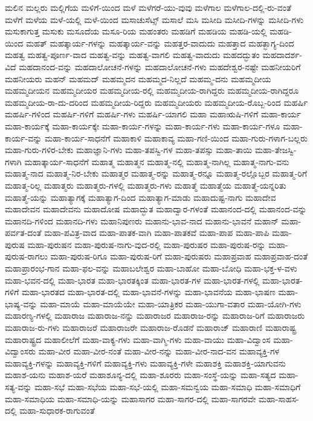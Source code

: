 {ಮಲಿನ
ಮಲ್ಲರು
ಮಲ್ಲಿಗೆಯ
ಮಳಿಗೆ-ಯಿಂದ
ಮಳೆ
ಮಳೆಗರೆ-ಯು-ವುವು
ಮಳೆಗಾಲ
ಮಳೆಗಾಲ-ದಲ್ಲಿ-ರು-ವಂತೆ
ಮಳೆಗೆ
ಮಳೆಯ
ಮಳೆ-ಯಲ್ಲಿ
ಮಳೆ-ಯಿಂದ
ಮಸಾಚುಸೆಟ್ಸ್
ಮಸಾಲೆ
ಮಸಿ
ಮಸೀದಿ
ಮಸೀದಿ-ಗಳನ್ನು
ಮಸೀದಿ-ಗಳು
ಮಸುಕಾಗುತ್ತ
ಮಸುಕು
ಮಸೂದೆಯ
ಮಸೂ-ರಿಯ
ಮಹಂತರು
ಮಹಡಿಗೆ
ಮಹಡಿಯ
ಮಹಡಿ-ಯಲ್ಲಿ
ಮಹಡಿ-ಯಿಂದ
ಮಹತ್
ಮಹತ್ಕಾರ್ಯ-ಗಳನ್ನು
ಮಹತ್ಕಾರ್ಯ-ವನ್ನು
ಮಹತ್ತರ-ವಾದುದು
ಮಹತ್ತಾದ
ಮಹತ್ಭಾಗ್ಯ-ದಿಂದ
ಮಹತ್ವ
ಮಹತ್ವ-ಪೂರ್ಣ-ವಾದ
ಮಹತ್ವ-ವನ್ನು
ಮಹತ್ವ-ವಾಗಲಿ
ಮಹತ್ವ-ವಾದುದು
ಮಹದದ್ಭುತಂ
ಮಹದಾದರ್ಶ-ವಿದೆ
ಮಹದಾನಂದ-ವನ್ನು
ಮಹದಾಲೋಚನೆ-ಗಳನ್ನು
ಮಹದಾಲೋಚನೆ-ಗಳು
ಮಹದೇಶ್ವರ-ನಷ್ಟೇ
ಮಹನೀಯರಿಗೆ
ಮಹನೀಯರು
ಮಹನ್
ಮಹಮದ್
ಮಹಮ್ಮದನ
ಮಹಮ್ಮದ-ನಿಲ್ಲದೆ
ಮಹಮ್ಮ-ದನು
ಮಹಮ್ಮದೀಯ
ಮಹಮ್ಮದೀಯನ
ಮಹಮ್ಮದೀಯರ
ಮಹಮ್ಮದೀಯ-ರಲ್ಲಿ
ಮಹಮ್ಮದೀಯ-ರಾಗಿದ್ದರು
ಮಹಮ್ಮದೀಯ-ರಾಗಿದ್ದರೂ
ಮಹಮ್ಮದೀಯ-ರಾ-ದು-ದರಿಂದ
ಮಹಮ್ಮದೀಯ-ರಿದ್ದರು
ಮಹಮ್ಮದೀಯರು
ಮಹಮ್ಮದೀಯ-ರೊಬ್ಬ-ರಿಂದ
ಮಹರ್ಷಿ
ಮಹರ್ಷಿ-ಗಳಿಂದ
ಮಹರ್ಷಿ-ಗಳಿಗೆ
ಮಹರ್ಷಿ-ಗಳು
ಮಹರ್ಷಿ-ಯಾಗಲಿ
ಮಹಾ
ಮಹಾಋಷಿ-ಗಳಿಗೆ
ಮಹಾ-ಕಾರ್ಯ
ಮಹಾ-ಕಾರ್ಯಕ್ಕೆ
ಮಹಾ-ಕಾರ್ಯಕ್ಕೇ
ಮಹಾ-ಕಾರ್ಯ-ಗಳನ್ನು
ಮಹಾ-ಕಾರ್ಯ-ಗಳು
ಮಹಾ-ಕಾರ್ಯ-ಗಳೂ
ಮಹಾ-ಕಾರ್ಯ-ವನ್ನು
ಮಹಾ-ಕಾರ್ಯ-ಸಾಧನೆಗೆ
ಮಹಾಕಾಳಿ
ಮಹಾಕಾವ್ಯ
ಮಹಾ-ಗಣಿ-ಯಿಂದ
ಮಹಾ-ಗುರು-ಗಳಾಗ-ಬಲ್ಲರು
ಮಹಾ-ಗುರು-ಗಳಿರ-ಬೇಕು
ಮಹಾಜ್ಞಾನಿ-ಗಳು
ಮಹಾ-ತಪಸ್ವಿ-ಗಳ
ಮಹಾ-ತಪಸ್ಸು
ಮಹಾ-ತಾಯಿ
ಮಹಾ-ತೇಜಸ್ವಿ-ಗಳಾಗಿ
ಮಹಾತ್ಕಾರ್ಯ-ಸಾಧನೆಗೆ
ಮಹಾತ್ಮ
ಮಹಾತ್ಮನ
ಮಹಾತ್ಮ-ನಲ್ಲಿ
ಮಹಾತ್ಮ-ನಾಗಿಲ್ಲ
ಮಹಾತ್ಮ-ನಾಗು-ವನು
ಮಹಾತ್ಮ-ನಾದ
ಮಹಾತ್ಮ-ನಿರ-ಬೇಕು
ಮಹಾತ್ಮರ
ಮಹಾತ್ಮ-ರನ್ನು
ಮಹಾತ್ಮ-ರನ್ನೂ
ಮಹಾತ್ಮ-ರಲ್ಲೊಬ್ಬರ
ಮಹಾತ್ಮ-ರಿಗೆ
ಮಹಾತ್ಮ-ರಿಲ್ಲ
ಮಹಾತ್ಮರು
ಮಹಾತ್ಮರು-ಗಳಲ್ಲಿ
ಮಹಾತ್ಮರು-ಗಳು
ಮಹಾತ್ಮೆ
ಮಹಾತ್ಮೆಯ
ಮಹಾತ್ಮೆ-ಯನ್ನರಿತು
ಮಹಾತ್ಮೆ-ಯನ್ನು
ಮಹಾತ್ಯಾಗಕ್ಕೆ
ಮಹಾತ್ಯಾಗ-ದಿಂದ
ಮಹಾತ್ಯಾಗ-ಮಾಡು
ಮಹಾದುಷ್ಟ-ನಾಗು
ಮಹಾದೇವ
ಮಹಾದೇವನ
ಮಹಾದೇವನು
ಮಹಾದೋಷ
ಮಹಾದ್ಭುತ
ಮಹಾದ್ವಾರ-ಗಳಂತೆ
ಮಹಾನಂದ-ದಲ್ಲಿ
ಮಹಾನಂದ-ವನ್ನು
ಮಹಾನದಿ-ಗಳಿಂದ
ಮಹಾನದಿ-ಗಳು
ಮಹಾನಿಪುಣರು
ಮಹಾನು-ಭಾವ-ನಾದ
ಮಹಾನು-ಭಾವನೆ
ಮಹಾನ್
ಮಹಾ-ಪರ್ವತ-ದಂತೆ
ಮಹಾ-ಪವಿತ್ರ-ವಾದ
ಮಹಾ-ಪಾತಕ-ವಾಗಿ
ಮಹಾ-ಪಾತಕವೆ
ಮಹಾ-ಪಾಪ
ಮಹಾ-ಪಾಪಿ
ಮಹಾ-ಪುರುಷ
ಮಹಾ-ಪುರುಷನ
ಮಹಾ-ಪುರುಷ-ನಾಗು-ವುದ-ರಲ್ಲಿ
ಮಹಾ-ಪುರುಷರ
ಮಹಾ-ಪುರುಷ-ರನ್ನು
ಮಹಾ-ಪುರುಷ-ರಾಗಲು
ಮಹಾ-ಪುರುಷ-ರಿಗೂ
ಮಹಾ-ಪುರುಷ-ರಿಗೆ
ಮಹಾ-ಪುರುಷರು
ಮಹಾಪ್ರವಾಹ
ಮಹಾಪ್ರವಾಹ-ದಂತೆ
ಮಹಾಪ್ರಾರಂಭ-ಗಾನ
ಮಹಾ-ಫಲ-ವನ್ನು
ಮಹಾಬಲೇಶ್ವರ
ಮಹಾ-ಬಾಹೋ
ಮಹಾ-ಬೋಧಿ
ಮಹಾ-ಭಕ್ತ-ಳ-ವಳು
ಮಹಾ-ಭವನ-ದಲ್ಲಿ
ಮಹಾ-ಭಾರತ
ಮಹಾ-ಭಾರತಕ್ಕಿಂತ
ಮಹಾ-ಭಾರತ-ಗಳ
ಮಹಾ-ಭಾರತ-ಗಳಲ್ಲಿ
ಮಹಾ-ಭಾರತ-ಗಳಿಗೆ
ಮಹಾ-ಭಾರತದ
ಮಹಾ-ಭಾರತ-ದಲ್ಲಿ
ಮಹಾ-ಭಾವನೆ-ಗಳನ್ನು
ಮಹಾ-ಭಾವನೆಯ
ಮಹಾ-ಭಾಷಣ
ಮಹಾ-ಭಾಷ್ಯ-ವನ್ನು
ಮಹಾ-ಮಾಯೆ
ಮಹಾ-ಮಾಯೆಯೇ
ಮಹಾ-ಯಾತ್ರಿಕರ
ಮಹಾ-ಯುಗಾ-ವತಾರ
ಮಹಾ-ಯೋಗಿ-ಗಳು
ಮಹಾರಣ್ಯ-ಗಳಲ್ಲಿ
ಮಹಾರಾಜ
ಮಹಾರಾಜ-ನನ್ನು
ಮಹಾರಾಜರ
ಮಹಾರಾಜ-ರನ್ನು
ಮಹಾರಾಜ-ರಿಗೆ
ಮಹಾರಾಜರು
ಮಹಾರಾಜ-ರು-ಗಳು
ಮಹಾರಾಜರೆ
ಮಹಾರಾಜರೇ
ಮಹಾರಾಜ-ರೊಡನೆ
ಮಹಾರಾಜ್
ಮಹಾರಾಣಿ
ಮಹಾರಾಷ್ಟ್ರ
ಮಹಾರಾಷ್ಟ್ರದ
ಮಹಾಲೀಲೆಗೆ
ಮಹಾ-ವಾಕ್ಯ-ಗಳು
ಮಹಾ-ವಾಗ್ಮಿ-ಗಳು
ಮಹಾ-ವಾಯು
ಮಹಾ-ವಿದ್ವಾಂಸ
ಮಹಾ-ವಿದ್ವಾಂಸರು
ಮಹಾ-ವೀರ
ಮಹಾ-ವೀರ-ನಂತೆ
ಮಹಾ-ವೀರ-ನನ್ನು
ಮಹಾ-ವೀರ-ನಾದ-ವನ
ಮಹಾವ್ಯಕ್ತಿ-ಗಳ
ಮಹಾವ್ಯಕ್ತಿ-ಗಳನ್ನು
ಮಹಾವ್ಯಕ್ತಿ-ಗಳಿಗೆ
ಮಹಾವ್ಯಕ್ತಿ-ಗಳು
ಮಹಾವ್ಯಕ್ತಿ-ಗಳೇ
ಮಹಾಶಕ್ತಿ
ಮಹಾಶಕ್ತಿ-ಯಾಗುವನು
ಮಹಾಶ-ಯನು
ಮಹಾಶ-ಯರೆ
ಮಹಾಶೂನ್ಯ-ದಲ್ಲಿ
ಮಹಾ-ಶೂರರು
ಮಹಾ-ಸಂಸ್ಥೆ-ಯನ್ನು
ಮಹಾ-ಸತ್ಯದ
ಮಹಾ-ಸತ್ಯ-ವನ್ನು
ಮಹಾ-ಸಭೆ
ಮಹಾ-ಸಭೆಯ
ಮಹಾ-ಸಭೆ-ಯಲ್ಲಿ
ಮಹಾ-ಸಮನ್ವಯ
ಮಹಾ-ಸಮಾಧಿ
ಮಹಾ-ಸಮಾಧಿಗೆ
ಮಹಾ-ಸಮಾಧಿಯ
ಮಹಾ-ಸಮಾಧಿ-ಯನ್ನು
ಮಹಾಸಾಗರ
ಮಹಾ-ಸಾಗರ-ದಲ್ಲಿ
ಮಹಾ-ಸಾಗರವೇ
ಮಹಾ-ಸಾಹಸ-ದಲ್ಲಿ
ಮಹಾ-ಸುಧಾರಕ-ರಾಗುವಂತೆ
}
